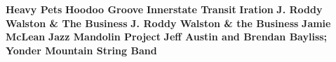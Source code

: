 \vspace{10pt} 
\noindent \textbf{Heavy Pets}\newline
\vspace{10pt} 
\newline
\vspace{10pt} 
\noindent \textbf{Hoodoo Groove}\newline
\vspace{10pt} 
\newline
\vspace{10pt} 
\noindent \textbf{Innerstate Transit}\newline
\vspace{10pt} 
\newline
\vspace{10pt} 
\noindent \textbf{Iration}\newline
\vspace{10pt} 
\newline
\vspace{10pt} 
\noindent \textbf{J. Roddy Walston \& The Business}\newline
\vspace{10pt} 
\newline
\vspace{10pt} 
\noindent \textbf{J. Roddy Walston \& the Business}\newline
\vspace{10pt} 
\newline
\vspace{10pt} 
\noindent \textbf{Jamie McLean}\newline
\vspace{10pt} 
\newline
\vspace{10pt} 
\noindent \textbf{Jazz Mandolin Project}\newline
\vspace{10pt} 
\newline
\vspace{10pt} 
\noindent \textbf{Jeff Austin and Brendan Bayliss; Yonder Mountain String Band}\newline
\vspace{10pt} 
\newline
